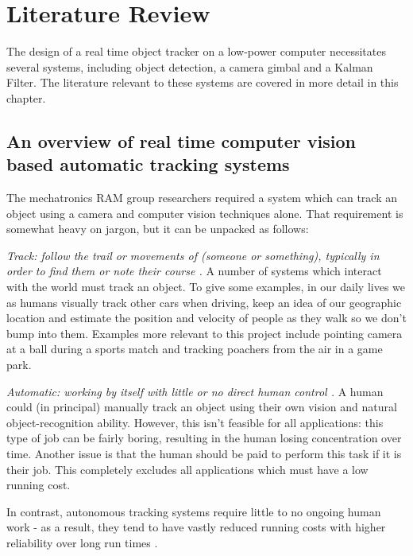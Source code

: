 \chapter{Literature Review}

The design of a real time object tracker on a low-power computer necessitates several systems, including object detection, a camera gimbal and a Kalman Filter. The literature relevant to these systems are covered in more detail in this chapter.

\section{An overview of real time computer vision based automatic tracking systems}\label{sec:compare_cv_techniques}
The mechatronics RAM group researchers required a system which can track an object using a camera and computer vision techniques alone. That requirement is somewhat heavy on jargon, but it can be unpacked as follows:

\textit{Track: follow the trail or movements of (someone or something), typically in order to find them or note their course \cite{website:definition_track}.}
%
A number of systems which interact with the world must track an object. To give some examples, in our daily lives we as humans visually track other cars when driving, keep an idea of our geographic location and estimate the position and velocity of people as they walk so we don't bump into them. Examples more relevant to this project include pointing camera at a ball during a sports match and tracking poachers from the air in a game park.



\textit{Automatic: working by itself with little or no direct human control \cite{website:definition_automation}.}
%
A human could (in principal) manually track an object using their own vision and natural object-recognition ability. However, this isn't feasible for all applications: this type of job can be fairly boring, resulting in the human losing concentration over time. Another issue is that the human should be paid to perform this task if it is their job. This completely excludes all applications which must have a low running cost.

In contrast, autonomous tracking systems require little to no ongoing human work - as a result, they tend to have vastly reduced running costs with higher reliability over long run times \cite{website:BCG_automation}.



